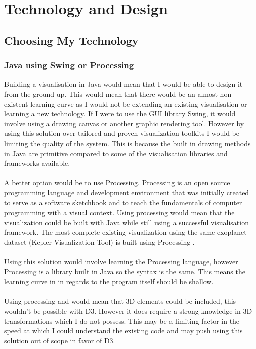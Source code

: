\documentclass[11pt
              , a4paper
              , twoside
              , openright
              ]{report}
\begin{document}
\chapter{Technology and Design}
\section{Choosing My Technology}
\subsection{Java using Swing or Processing}
Building a visualisation in Java would mean that I would be able to design it
from the ground up. This would mean that there would be an almost non existent
learning curve as I would not be extending an existing visualisation or learning
a new technology.  If I were to use the GUI library Swing, it would involve
using a drawing canvas or another graphic rendering tool. However by using this
solution over tailored and  proven visualization toolkits I would be limiting
the quality of the system. This is because the built in drawing methods in Java
are primitive compared to some of the visualisation libraries and frameworks
available.
\\\\
A better option would be to use Processing. Processing is an open source
programming language and development environment that was initially created to
serve as a software sketchbook and to teach the fundamentals of computer
programming with a visual context. Using processing would mean that the
visualization could be built with Java while still using a successful
visualisation framework. The most complete existing visualization using the same
exoplanet dataset (Kepler Visualization Tool) is built using Processing . 
\\\\
Using this solution would involve learning the Processing language, however
Processing is a library built in Java so the syntax is the same. This means the
learning curve in in regards to the program itself should be shallow.
\\\\
Using processing and would mean that 3D elements could be included, this
wouldn’t be possible with D3. However it does require a strong knowledge in 3D
transformations which I do not possess. This may be a limiting factor in the
speed at which I could understand the existing code and may push using this
solution out of scope in favor of D3.
\\\\
\end{document}
